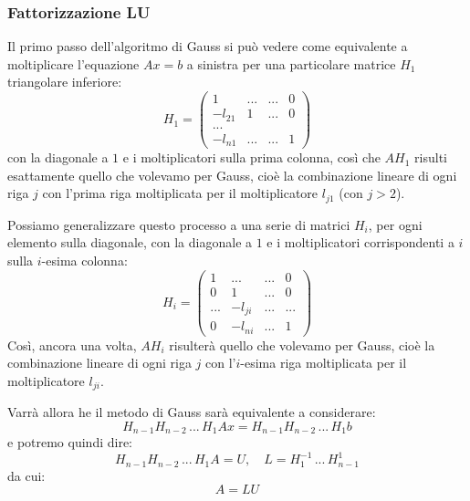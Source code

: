 \documentclass[a4paper,11pt]{article}
\begin{document}
\subsubsection{Fattorizzazione LU}
Il primo passo dell'algoritmo di Gauss si può vedere come equivalente a moltiplicare l'equazione $Ax = b$ a sinistra per una particolare matrice $H_1$ triangolare inferiore:
$$
H_1 = \begin{pmatrix}
	1 & ... & ... & 0 \\
	-l_{21} & 1 & ... & 0 \\
	... \\ 
	-l_{n1} & ... & ... & 1
\end{pmatrix}
$$
con la diagonale a $1$ e i moltiplicatori sulla prima colonna, così che $A H_1$ risulti esattamente quello che volevamo per Gauss, cioè la combinazione lineare di ogni riga $j$ con l'prima riga moltiplicata per il moltiplicatore $l_{j1}$ (con $j > 2$).

Possiamo generalizzare questo processo a una serie di matrici $H_i$, per ogni elemento sulla diagonale, con la diagonale a $1$ e i moltiplicatori corrispondenti a $i$ sulla $i$-esima colonna:
$$
H_i = \begin{pmatrix}
	1 & ... & ... & 0 \\
	0 & 1 & ... & 0 \\
	... & -l_{ji} & ... & ... \\
	0 & -l_{ni} & ... & 1
\end{pmatrix}
$$
Così, ancora una volta, $A H_i$ risulterà quello che volevamo per Gauss, cioè la combinazione lineare di ogni riga $j$ con l'$i$-esima riga moltiplicata per il moltiplicatore $l_{ji}$.

Varrà allora he il metodo di Gauss sarà equivalente a considerare:
$$
H_{n - 1} H_{n - 2} \, ... \, H_1 A x = H_{n - 1} H_{n - 2} \, ... \, H_1 b
$$
e potremo quindi dire:
$$
H_{n - 1} H_{n - 2} \, ... \, H_1 A = U, \quad L = H_1^{-1} \, ... \, H_{n - 1}^1 
$$
da cui:
$$
A = LU
$$
\end{document}
